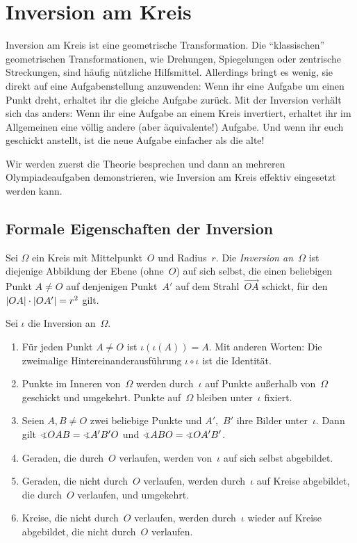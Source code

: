 \section{Inversion am Kreis}\label{kapitel:Inversion}
Inversion am Kreis ist eine geometrische Transformation. Die \enquote{klassischen} geometrischen Transformationen, wie Drehungen, Spiegelungen oder zentrische Streckungen, sind häufig nützliche Hilfsmittel. Allerdings bringt es wenig, sie direkt auf eine Aufgabenstellung anzuwenden: Wenn ihr eine Aufgabe um einen Punkt dreht, erhaltet ihr die gleiche Aufgabe zurück. Mit der Inversion verhält sich das anders: Wenn ihr eine Aufgabe an einem Kreis invertiert, erhaltet ihr im Allgemeinen eine völlig andere (aber äquivalente!) Aufgabe. Und wenn ihr euch geschickt anstellt, ist die neue Aufgabe einfacher als die alte!

Wir werden zuerst die Theorie besprechen und dann an mehreren Olympiadeaufgaben demonstrieren, wie Inversion am Kreis effektiv eingesetzt werden kann.

\subsection*{Formale Eigenschaften der Inversion}
\begin{definition}
	Sei $\Omega$ ein Kreis mit Mittelpunkt~$O$ und Radius~$r$. Die \emph{Inversion an~$\Omega$} ist diejenige Abbildung der Ebene (ohne~$O$) auf sich selbst, die einen beliebigen Punkt $A\neq O$ auf denjenigen Punkt~$A'$ auf dem Strahl~$\overrightarrow{OA}$ schickt, für den $\lvert OA\rvert\cdot \lvert OA'\rvert=r^2$ gilt.
\end{definition}

\begin{satzmitnamen}
	Sei $\iota$ die Inversion an~$\Omega$.
	\begin{enumerate}
		\item \label{itm:Involution}
		Für jeden Punkt $A\neq O$ ist $\iota(\iota(A))=A$. Mit anderen Worten: Die zweimalige Hintereinanderausführung $\iota\circ\iota$ ist die Identität.
		\item \label{itm:Vertauschen}
		Punkte im Inneren von~$\Omega$ werden durch~$\iota$ auf Punkte außerhalb von~$\Omega$ geschickt und umgekehrt. Punkte auf~$\Omega$ bleiben unter~$\iota$ fixiert.
		\item \label{itm:Winkel}
		Seien $A,B\neq O$ zwei beliebige Punkte und $A'$,~$B'$ ihre Bilder unter~$\iota$. Dann gilt $\winkel OAB=\winkel A'B'O$ und $\winkel ABO=\winkel OA'B'$. %
		\item \label{itm:GeradeGerade}
		Geraden, die durch~$O$ verlaufen, werden von~$\iota$ auf sich selbst abgebildet.
		\item \label{itm:GeradeKreis}
		Geraden, die nicht durch~$O$ verlaufen, werden durch~$\iota$ auf Kreise abgebildet, die durch~$O$ verlaufen, und umgekehrt.
		\item \label{itm:KreisKreis}
		Kreise, die nicht durch~$O$ verlaufen, werden durch~$\iota$ wieder auf Kreise abgebildet, die nicht durch~$O$ verlaufen.
	\end{enumerate}
\end{satzmitnamen}

